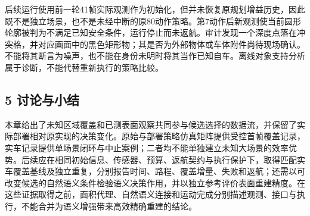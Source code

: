\documentclass[]{article}
\begin{document}
后续运行使用前一轮41帧实际观测作为初始化，但并未恢复原规划增益历史，因此既不是独立场景，也不是未经中断的原80动作策略。第7动作后新观测使当前圆形轮廓被判为不满足已知安全条件，运行停止而未返航。审计发现一个深度点落在冲突格，并对应画面中的黑色矩形物；其是否为外部物体或车体附件尚待现场确认。不能将其断言为噪声，也不能在身份未明时将其当作已知自车。离线对象支持分析属于诊断，不能代替重新执行的策略比较。

\hypertarget{ux8ba8ux8bbaux4e0eux5c0fux7ed3}{%
\subsection{5 讨论与小结}\label{ux8ba8ux8bbaux4e0eux5c0fux7ed3}}

本章给出了未知区域覆盖和已测表面观察共同参与候选选择的数据流，并保留了实际部署相对原实现的决策变化。原始与部署策略仿真矩阵提供受控首帧覆盖记录，实车记录提供单场景闭环与中止案例；二者均不能单独建立未知大场景的效率优势。后续应在相同初始信息、传感器、预算、返航契约与执行保护下，取得匹配实车覆盖基线及独立重复，分别报告时间、路程、覆盖增量、失败和返航；还需以可改变候选的自然语义条件检验语义决策作用，并以独立参考评价表面重建精度。在这些证据取得之前，面积代理、自然语义连接和运动完成分别描述观测、接口与执行，不能合并为语义增强带来高效精确重建的结论。
\end{document}
